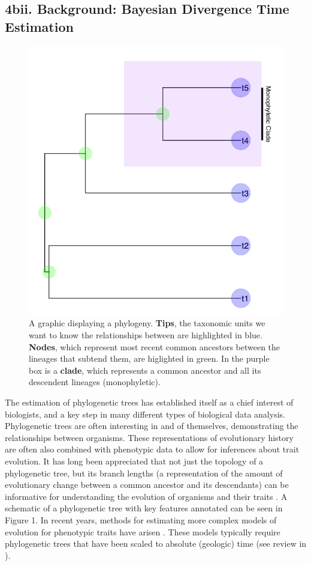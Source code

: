 \documentclass[12pt]{article}
\begin{document}
\subsection*{4bii. Background: Bayesian Divergence Time Estimation}
\begin{figure}
	
    \includegraphics[width=.5\textwidth]{Fig1.png}
       \caption{A graphic displaying a phylogeny. \textbf{Tips}, the taxonomic units we want to know the relationships between are highlighted in blue. \textbf{Nodes}, which represent most recent common ancestors between the lineages that subtend them, are higlighted in green. In the purple box is a \textbf{clade}, which represents a common ancestor and all its descendent lineages (monophyletic).}
\end{figure}
The estimation of phylogenetic trees has established itself as a chief interest of biologists, and a key step in many different types of biological data analysis.
Phylogenetic trees are often interesting in and of themselves, demonstrating the relationships between organisms.
These representations of evolutionary history are often also combined with phenotypic data to allow for inferences about trait evolution.
It has long been appreciated that not just the topology of a phylogenetic tree, but its branch lengths (a representation of the amount of evolutionary change between a common ancestor and its descendants) can be informative for understanding the evolution of organisms and their traits \cite{Felsenstein1985a}. 
A schematic of a phylogenetic tree with key features annotated can be seen in Figure 1.
In recent years, methods for estimating more complex models of evolution for phenotypic traits have arisen \cite{FitzJohn2009, Harmon2008, Beaulieu2016}.
These models  typically require phylogenetic trees that have been scaled to absolute (geologic) time (see review in \cite{O'Meara2012}). \par
\end{document}
